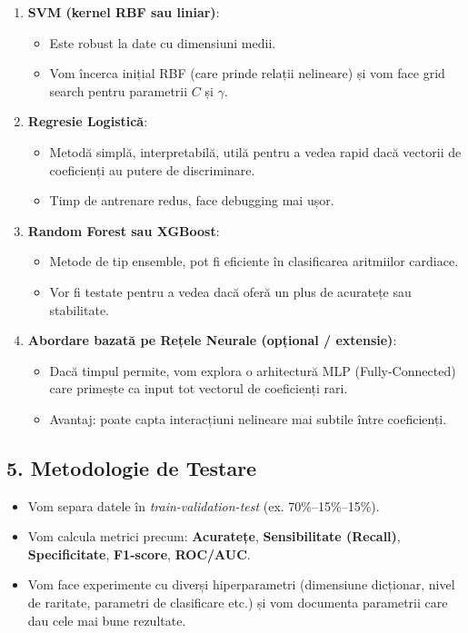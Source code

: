 \documentclass[12pt]{article}
\begin{document}
\begin{enumerate}[label=(\arabic*)]
    \item \textbf{SVM (kernel RBF sau liniar)}:
    \begin{itemize}
        \item Este robust la date cu dimensiuni medii.
        \item Vom încerca inițial RBF (care prinde relații nelineare) și vom face grid search pentru parametrii $C$ și $\gamma$.
    \end{itemize}

    \item \textbf{Regresie Logistică}:
    \begin{itemize}
        \item Metodă simplă, interpretabilă, utilă pentru a vedea rapid dacă vectorii de coeficienți au putere de discriminare.
        \item Timp de antrenare redus, face debugging mai ușor.
    \end{itemize}

    \item \textbf{Random Forest sau XGBoost}:
    \begin{itemize}
        \item Metode de tip ensemble, pot fi eficiente în clasificarea aritmiilor cardiace.
        \item Vor fi testate pentru a vedea dacă oferă un plus de acuratețe sau stabilitate.
    \end{itemize}

    \item \textbf{Abordare bazată pe Rețele Neurale (opțional / extensie)}:
    \begin{itemize}
        \item Dacă timpul permite, vom explora o arhitectură MLP (Fully-Connected) care primește ca input tot vectorul de coeficienți rari.
        \item Avantaj: poate capta interacțiuni nelineare mai subtile între coeficienți.
    \end{itemize}
\end{enumerate}

\subsection*{5. Metodologie de Testare}

\begin{itemize}
    \item Vom separa datele în \emph{train-validation-test} (ex. 70\%--15\%--15\%).
    \item Vom calcula metrici precum: \textbf{Acuratețe}, \textbf{Sensibilitate (Recall)}, \textbf{Specificitate}, \textbf{F1-score}, \textbf{ROC/AUC}.
    \item Vom face experimente cu diverși hiperparametri (dimensiune dicționar, nivel de raritate, parametri de clasificare etc.) și vom documenta parametrii care dau cele mai bune rezultate.
\end{itemize}
\end{document}
